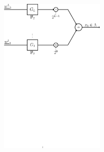 \documentclass[10pt]{beamer}
\newcommand{\defeq}{\triangleq}
\begin{document}
\begin{frame}
\begin{columns}
\begin{column}{0.47\textwidth}
            \begin{figure}
                \includegraphics[width=2in]{lattice_Constr_D1_user2}
            \end{figure}
        \end{column}
\end{columns}
\end{frame}

%


\end{document}
